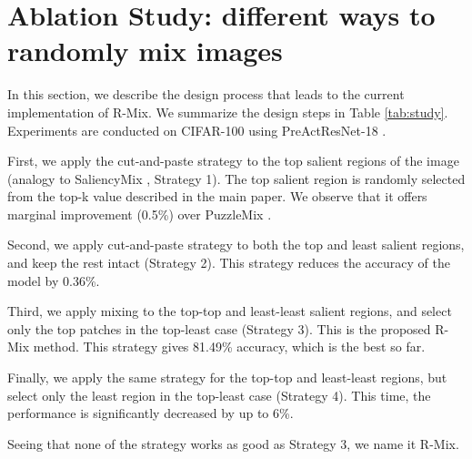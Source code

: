 \documentclass[letterpaper]{article} \usepackage[submission]{aaai23}  \usepackage{times}  \usepackage{helvet}  \usepackage{courier}  \usepackage[hyphens]{url}  \usepackage{graphicx} \urlstyle{rm} \def\UrlFont{\rm}  \usepackage{natbib}  \usepackage{caption} \frenchspacing  \setlength{\pdfpagewidth}{8.5in} \setlength{\pdfpageheight}{11in}
\begin{document}
\section*{Ablation Study: different ways to randomly mix images}
In this section, we describe the design process that leads to the current implementation of R-Mix. We summarize the design steps in Table \ref{tab:study}. Experiments are conducted on CIFAR-100 \cite{Krizhevsky09cifar100} using PreActResNet-18 \cite{he2016preact}.

First, we apply the cut-and-paste strategy to the top salient regions of the image (analogy to SaliencyMix \cite{uddin2021saliencymix}, Strategy 1). The top salient region is randomly selected from the top-k value described in the main paper. We observe that it offers marginal improvement (0.5\%) over PuzzleMix \cite{kim2020puzzlemix}.

Second, we apply cut-and-paste strategy to both the top and least salient regions, and keep the rest intact (Strategy 2). This strategy reduces the accuracy of the model by 0.36\%.

Third, we apply mixing to the top-top and least-least salient regions, and select only the top patches in the top-least case (Strategy 3). This is the proposed R-Mix method. This strategy gives 81.49\% accuracy, which is the best so far.

Finally, we apply the same strategy for the top-top and least-least regions, but select only the least region in the top-least case (Strategy 4). This time, the performance is significantly decreased by up to 6\%.

Seeing that none of the strategy works as good as Strategy 3, we name it R-Mix.
\end{document}
